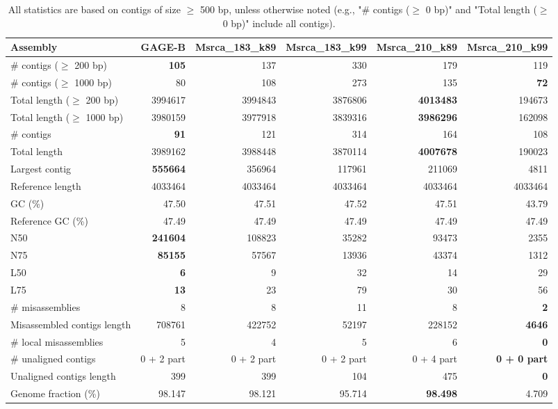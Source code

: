 \documentclass[12pt,a4paper]{article}
\begin{document}
\begin{table}[ht]
\begin{center}
\caption{All statistics are based on contigs of size $\geq$ 500 bp, unless otherwise noted (e.g., "\# contigs ($\geq$ 0 bp)" and "Total length ($\geq$ 0 bp)" include all contigs).}
\begin{tabular}{|l*{5}{|r}|}
\hline
Assembly & GAGE-B & Msrca\_183\_k89 & Msrca\_183\_k99 & Msrca\_210\_k89 & Msrca\_210\_k99 \\ \hline
\# contigs ($\geq$ 200 bp) & {\bf 105} & 137 & 330 & 179 & 119 \\ \hline
\# contigs ($\geq$ 1000 bp) & 80 & 108 & 273 & 135 & {\bf 72} \\ \hline
Total length ($\geq$ 200 bp) & 3994617 & 3994843 & 3876806 & {\bf 4013483} & 194673 \\ \hline
Total length ($\geq$ 1000 bp) & 3980159 & 3977918 & 3839316 & {\bf 3986296} & 162098 \\ \hline
\# contigs & {\bf 91} & 121 & 314 & 164 & 108 \\ \hline
Total length & 3989162 & 3988448 & 3870114 & {\bf 4007678} & 190023 \\ \hline
Largest contig & {\bf 555664} & 356964 & 117961 & 211069 & 4811 \\ \hline
Reference length & 4033464 & 4033464 & 4033464 & 4033464 & 4033464 \\ \hline
GC (\%) & 47.50 & 47.51 & 47.52 & 47.51 & 43.79 \\ \hline
Reference GC (\%) & 47.49 & 47.49 & 47.49 & 47.49 & 47.49 \\ \hline
N50 & {\bf 241604} & 108823 & 35282 & 93473 & 2355 \\ \hline
N75 & {\bf 85155} & 57567 & 13936 & 43374 & 1312 \\ \hline
L50 & {\bf 6} & 9 & 32 & 14 & 29 \\ \hline
L75 & {\bf 13} & 23 & 79 & 30 & 56 \\ \hline
\# misassemblies & 8 & 8 & 11 & 8 & {\bf 2} \\ \hline
Misassembled contigs length & 708761 & 422752 & 52197 & 228152 & {\bf 4646} \\ \hline
\# local misassemblies & 5 & 4 & 5 & 6 & {\bf 0} \\ \hline
\# unaligned contigs & 0 + 2 part & 0 + 2 part & 0 + 2 part & 0 + 4 part & {\bf 0 + 0 part} \\ \hline
Unaligned contigs length & 399 & 399 & 104 & 475 & {\bf 0} \\ \hline
Genome fraction (\%) & 98.147 & 98.121 & 95.714 & {\bf 98.498} & 4.709 \\ \hline

\end{tabular}
\end{center}
\end{table}
\end{document}
